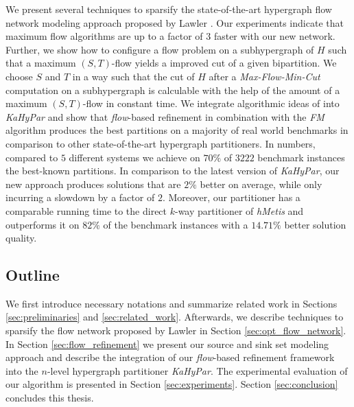 We present several techniques to sparsify the state-of-the-art hypergraph flow network
modeling approach proposed by Lawler \cite{lawler1973}. Our experiments indicate that
maximum flow algorithms are up to a factor of $3$ faster with our new network. Further, 
we show how to configure a flow problem on a subhypergraph of $H$ such that a 
maximum $(S,T)$-flow yields a improved cut of a given bipartition. We choose $S$ and
$T$ in a way such that the cut of $H$ after a \emph{Max-Flow-Min-Cut} computation on a subhypergraph 
is calculable with the help of the amount of a maximum $(S,T)$-flow in constant time.
We integrate algorithmic ideas of \cite{sanders2011engineering} into 
\emph{KaHyPar} and show that \emph{flow}-based refinement in combination with the
\emph{FM} algorithm produces the best partitions on a majority of real world benchmarks
in comparison to other state-of-the-art hypergraph partitioners. 
In numbers, compared to $5$ different systems we achieve on $70\%$ 
of $3222$ benchmark instances the best-known partitions. In comparison to the 
latest version of \emph{KaHyPar}, our new approach produces solutions that are
$2\%$ better on average, while only incurring a slowdown by a factor of $2$.
Moreover, our partitioner has a comparable running time to the direct $k$-way
partitioner of \emph{hMetis} and outperforms it on $82\%$ of the benchmark instances
with a $14.71\%$ better solution quality.

\subsection{Outline}

We first introduce necessary notations and summarize related work in Sections \ref{sec:preliminaries}
and \ref{sec:related_work}. Afterwards, we describe techniques to sparsify the flow network
proposed by Lawler \cite{lawler1973} in Section \ref{sec:opt_flow_network}. In Section
\ref{sec:flow_refinement} we present our source and sink set modeling
approach and describe the integration of our \emph{flow}-based refinement framework into
the $n$-level hypergraph partitioner \emph{KaHyPar}. The experimental evaluation of our algorithm
is presented in Section \ref{sec:experiments}. Section \ref{sec:conclusion} concludes this thesis.